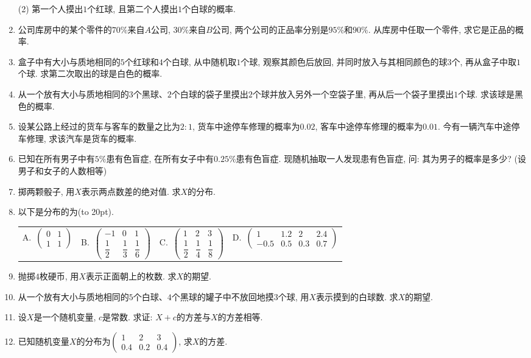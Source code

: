 \documentclass[10pt,a4paper]{article}
\newcommand{\bracket}[1]{(\hbox to #1pt{})}
\newcommand{\fourch}[4]{\par\begin{tabular}{p{.23\textwidth}p{.23\textwidth}p{.23\textwidth}p{.23\textwidth}}
A.~#1 &B.~#2& C.~#3& D.~#4
\end{tabular}}
\begin{document}
\begin{enumerate}[1.]
(2) 第一个人摸出$1$个红球, 且第二个人摸出$1$个白球的概率.
\item 公司库房中的某个零件的$70\%$来自$A$公司, $30\%$来自$B$公司, 两个公司的正品率分别是$95\%$和$90\%$. 从库房中任取一个零件, 求它是正品的概率.
\item 盒子中有大小与质地相同的$5$个红球和$4$个白球, 从中随机取$1$个球, 观察其颜色后放回, 并同时放入与其相同颜色的球$3$个, 再从盒子中取$1$个球. 求第二次取出的球是白色的概率.
\item 从一个放有大小与质地相同的$3$个黑球、$2$个白球的袋子里摸出$2$个球并放入另外一个空袋子里, 再从后一个袋子里摸出$1$个球. 求该球是黑色的概率. 
\item 设某公路上经过的货车与客车的数量之比为$2: 1$, 货车中途停车修理的概率为$0.02$, 客车中途停车修理的概率为$0.01$. 今有一辆汽车中途停车修理, 求该汽车是货车的概率.
\item 已知在所有男子中有$5\%$患有色盲症, 在所有女子中有$0.25\%$患有色盲症. 现随机抽取一人发现患有色盲症, 问: 其为男子的概率是多少? (设男子和女子的人数相等)
\item 掷两颗骰子, 用$X$表示两点数差的绝对值. 求$X$的分布.
\item 以下是分布的为\bracket{20}.
\fourch{$\begin{pmatrix}0 & 1 \\ 1 & 1\end{pmatrix}$}{$\begin{pmatrix}-1 & 0 & 1\\ \dfrac 12 & \dfrac 13 & \dfrac 16\end{pmatrix}$}{$\begin{pmatrix}1 & 2 & 3\\ \dfrac 12 & \dfrac 14 & \dfrac 18\end{pmatrix}$}{$\begin{pmatrix}1 & 1.2 & 2 & 2.4 \\ -0.5 & 0.5 & 0.3 & 0.7\end{pmatrix}$}
\item 抛掷$4$枚硬币, 用$X$表示正面朝上的枚数. 求$X$的期望.
\item 从一个放有大小与质地相同的$5$个白球、$4$个黑球的罐子中不放回地摸$3$个球, 用$X$表示摸到的白球数. 求$X$的期望. 
\item 设$X$是一个随机变量, $c$是常数. 求证: $X+c$的方差与$X$的方差相等.
\item 已知随机变量$X$的分布为$\begin{pmatrix}1 & 2 & 3 \\ 0.4 & 0.2 & 0.4\end{pmatrix}$, 求$X$的方差. 

\end{enumerate}
\end{document}
